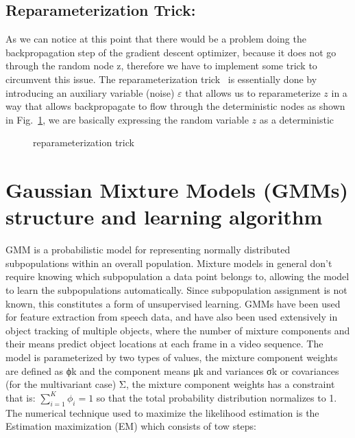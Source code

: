 \subsection{Reparameterization Trick:}
\label{cha:VAE_REparam}
As we can notice at this point that there would be a problem doing the backpropagation step of the gradient descent optimizer, because it does not go through the random node z, therefore we have to implement some trick to circumvent this issue. The reparameterization trick~\cite{kingma2013auto} is essentially done by introducing an auxiliary variable (noise) $\varepsilon$ that allows us to reparameterize $z$ in a way that allows backpropagate to flow through the deterministic nodes as shown in Fig.~\ref{fig:paratrick}, we are basically expressing the random variable $z$ as a deterministic 

\begin{figure}
	\centerline
	\paratrick
	\caption{reparameterization trick}
	\label{fig:paratrick}
\end{figure} 

\section{Gaussian Mixture Models (GMMs) structure and learning algorithm}

\label{cha:GMM}
GMM is a probabilistic model for representing normally distributed subpopulations within an overall population. Mixture models in general don't require knowing which subpopulation a data point belongs to, allowing the model to learn the subpopulations automatically. Since subpopulation assignment is not known, this constitutes a form of unsupervised learning. GMMs have been used for feature extraction from speech data, and have also been used extensively in object tracking of multiple objects, where the number of mixture components and their means predict object locations at each frame in a video sequence.
The model is parameterized by two types of values, the mixture component weights are defined as ϕk and the component means μk and variances σk or covariances (for the multivariant case) Σ, the mixture component weights has a constraint that is:  $\sum_{i=1}^{K} \phi_i = 1$ so that the total probability distribution normalizes to 1. The numerical technique used to maximize the likelihood estimation is the Estimation maximization (EM) which consists of tow steps:

